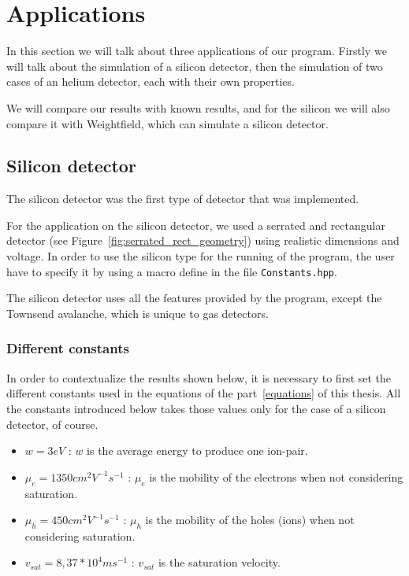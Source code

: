 \documentclass[11pt]{article}
\begin{document}
\section{Applications}

	In this section we will talk about three applications of our program.
	Firstly we will talk about the simulation of a silicon detector, then the
	simulation of two cases of an helium detector, each with their own properties.

	We will compare our results with known results, and for the silicon we will also
	compare it with Weightfield, which can simulate a silicon detector.

	\subsection{Silicon detector}

		The silicon detector was the first type of detector that was implemented.

		For the application on the silicon detector, we used a serrated and rectangular detector
		(see Figure~\ref{fig:serrated_rect_geometry}) using realistic dimensions and voltage.
		In order to use the silicon type for the running of the program, the user have to specify
		it by using a macro define in the file \texttt{Constants.hpp}.

		The silicon detector uses all the features provided by the program, except the Townsend
		avalanche, which is unique to gas detectors.

		\subsubsection*{Different constants}

			In order to contextualize the results shown below, it is necessary to first set the
			different constants used in the equations of the part~\ref{equations} of this thesis.
			All the constants introduced below takes those values only for the case of a silicon
			detector, of course.

			\begin{itemize}

				\item $w = 3 eV$ : $w$ is the average energy to produce one ion-pair.
				\item $\mu_e = 1350 cm^2V^{-1}s^{-1}$ : $\mu_e$ is the mobility of the electrons
					when not considering saturation.
				\item $\mu_h = 450 cm^2V^{-1}s^{-1}$ : $\mu_h$ is the mobility of the holes (ions)
					when not considering saturation.
				\item $v_{sat} = 8,37*10^{4} ms^{-1}$ : $v_{sat}$ is the saturation velocity.

			\end{itemize}
\end{document}

